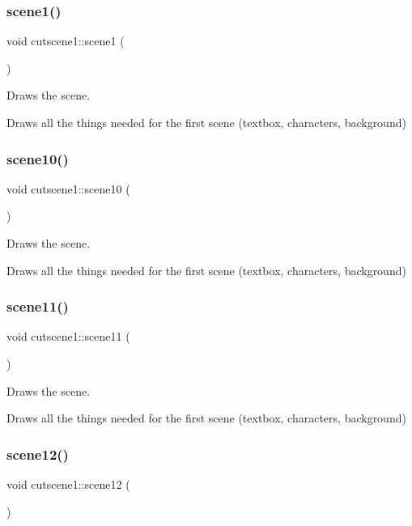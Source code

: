 \subsubsection{\texorpdfstring{scene1()}{scene1()}}
{\footnotesize\ttfamily void cutscene1\+::scene1 (\begin{DoxyParamCaption}{ }\end{DoxyParamCaption})}



Draws the scene. 

Draws all the things needed for the first scene (textbox, characters, background) \mbox{\label{classcutscene1_ad8352de19bf15b9b1104b76d4c278be8}} 
\subsubsection{\texorpdfstring{scene10()}{scene10()}}
{\footnotesize\ttfamily void cutscene1\+::scene10 (\begin{DoxyParamCaption}{ }\end{DoxyParamCaption})}



Draws the scene. 

Draws all the things needed for the first scene (textbox, characters, background) \mbox{\label{classcutscene1_ac86b4ca661908ea43d5b672f3fc359c3}} 
\subsubsection{\texorpdfstring{scene11()}{scene11()}}
{\footnotesize\ttfamily void cutscene1\+::scene11 (\begin{DoxyParamCaption}{ }\end{DoxyParamCaption})}



Draws the scene. 

Draws all the things needed for the first scene (textbox, characters, background) \mbox{\label{classcutscene1_a6c57956c7ec2eb301b2f093a1b3c9925}} 
\subsubsection{\texorpdfstring{scene12()}{scene12()}}
{\footnotesize\ttfamily void cutscene1\+::scene12 (\begin{DoxyParamCaption}{ }\end{DoxyParamCaption})}



